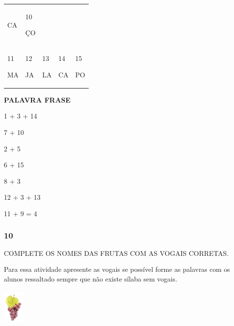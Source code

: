 \begin{longtable}[]{@{}lllll@{}}
\begin{minipage}[t]{0.19\columnwidth}
CA\strut
\end{minipage} & \begin{minipage}[t]{0.19\columnwidth}\raggedright\strut
10

ÇO\strut
\end{minipage}\tabularnewline
\begin{minipage}[t]{0.19\columnwidth}\raggedright\strut
11

MA\strut
\end{minipage} & \begin{minipage}[t]{0.19\columnwidth}\raggedright\strut
12

JA\strut
\end{minipage} & \begin{minipage}[t]{0.19\columnwidth}\raggedright\strut
13

LA\strut
\end{minipage} & \begin{minipage}[t]{0.19\columnwidth}\raggedright\strut
14

CA\strut
\end{minipage} & \begin{minipage}[t]{0.19\columnwidth}\raggedright\strut
15

PO\strut
\end{minipage}\tabularnewline
\bottomrule
\end{longtable}

\textbf{PALAVRA FRASE}

1 + 3 + 14

7 + 10

2 + 5

6 + 15

8 + 3

12 + 3 + 13

11 + 9 = 4

\subsubsection{10 }\label{section-24}

COMPLETE OS NOMES DAS FRUTAS COM AS VOGAIS CORRETAS.

Para essa atividade apresente as vogais se possível forme as palavras
com os alunos ressaltado sempre que não existe sílaba sem vogais.

\includegraphics[width=0.42675in,height=0.72128in]{media/image69.jpeg}

